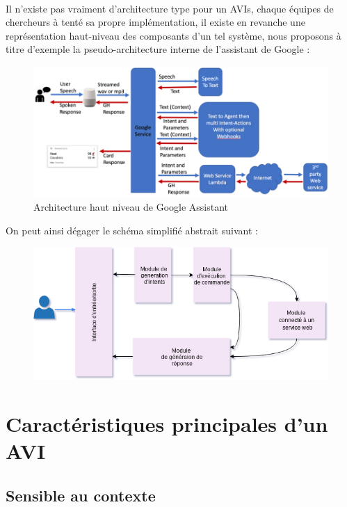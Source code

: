 \paragraph{}
Il n'existe pas vraiment d'architecture type pour un AVIs, chaque équipes de chercheurs à tenté sa propre implémentation, il existe en revanche une représentation haut-niveau des composants d'un tel système, nous proposons à titre d'exemple la pseudo-architecture interne de l'assistant de Google : 
\begin{figure}[H]
	\centering
	\includegraphics[width=\linewidth]{images/SPA_architecture.png}
	\caption{Architecture haut niveau de Google Assistant \cite{GAlayout}}
\end{figure}
On peut ainsi dégager le schéma simplifié abstrait suivant : 
\begin{figure}[H]
	\centering
	\includegraphics[width=\linewidth]{images/SPA_diagram.png}
\end{figure}

\section{Caractéristiques principales d'un AVI}
\subsection{Sensible au contexte}
